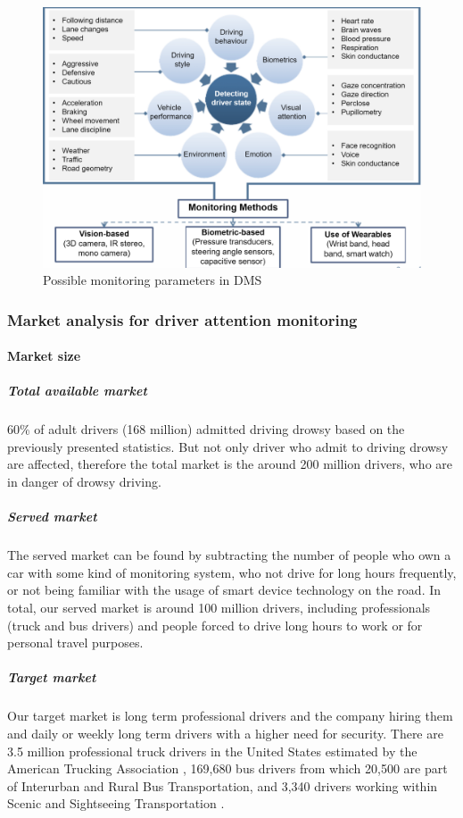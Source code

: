 \documentclass[letterpaper,10pt]{article}
\begin{document}
\begin{figure}[h]
\centering
\includegraphics[scale=0.4]{DSMsonsors.PNG}
\caption[Possible monitoring parameters in DMS]{Possible monitoring parameters in DMS\cite{f&s_car}}
\label{fig:techdms}
\end{figure}


\subsubsection{Market analysis for driver attention monitoring}

\paragraph{Market size}

\subparagraph{Total available market} 60\% of adult drivers (168 million) admitted driving drowsy based on the previously presented statistics. But not only driver who admit to driving drowsy are affected, therefore the total market is the around 200 million drivers, who are in danger of drowsy driving. \cite{drowsy} 

\subparagraph{Served market} The served market can be found by subtracting the number of people who own a car with some kind of monitoring system, who not drive for long hours frequently, or not being familiar with the usage of smart device technology on the road. In total, our served market is around 100 million drivers, including professionals (truck and bus drivers) and people forced to drive long hours to work or for personal travel purposes.

\subparagraph{Target market} Our target market is long term professional drivers and the company hiring them and daily or weekly long term drivers with a higher need for security. There are 3.5 million professional truck drivers in the United States estimated by the American Trucking Association \cite{trucking},  169,680 bus drivers from which 20,500 are part of Interurban and Rural Bus Transportation, and 3,340 drivers working within Scenic and Sightseeing Transportation \cite{bus}. 
\end{document}
